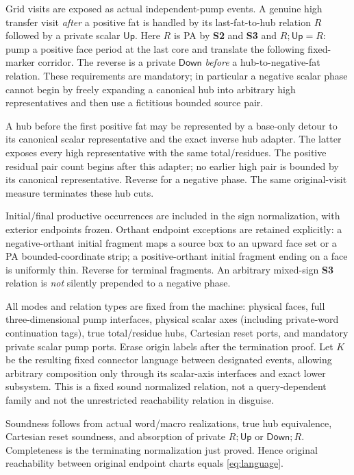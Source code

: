 \documentclass[11pt,a4paper]{article}
\theoremstyle{remark}
\newcommand{\Up}{\mathsf{Up}}
\newcommand{\Down}{\mathsf{Down}}
\begin{document}
Grid visits are exposed as actual independent-pump events. A genuine high transfer visit \emph{after} a positive fat is handled by its last-fat-to-hub relation \(R\) followed by a private scalar \(\Up\). Here \(R\) is PA by \textbf{S2} and \textbf{S3} and \(R;\Up=R\): pump a positive face period at the last core and translate the following fixed-marker corridor. The reverse is a private \(\Down\) \emph{before} a hub-to-negative-fat relation. These requirements are mandatory; in particular a negative scalar phase cannot begin by freely expanding a canonical hub into arbitrary high representatives and then use a fictitious bounded source pair.

A hub before the first positive fat may be represented by a base-only detour to its canonical scalar representative and the exact inverse hub adapter. The latter exposes every high representative with the same total/residues. The positive residual pair count begins after this adapter; no earlier high pair is bounded by its canonical representative. Reverse for a negative phase. The same original-visit measure terminates these hub cuts.

Initial/final productive occurrences are included in the sign normalization, with exterior endpoints frozen. Orthant endpoint exceptions are retained explicitly: a negative-orthant initial fragment maps a source box to an upward face set or a PA bounded-coordinate strip; a positive-orthant initial fragment ending on a face is uniformly thin. Reverse for terminal fragments. An arbitrary mixed-sign \textbf{S3} relation is \emph{not} silently prepended to a negative phase.

All modes and relation types are fixed from the machine: physical faces, full three-dimensional pump interfaces, physical scalar axes (including private-word continuation tags), true total/residue hubs, Cartesian reset ports, and mandatory private scalar pump ports. Erase origin labels after the termination proof. Let \(K\) be the resulting fixed connector language between designated events, allowing arbitrary composition only through its scalar-axis interfaces and exact lower subsystem. This is a fixed sound normalized relation, not a query-dependent family and not the unrestricted reachability relation in disguise.

Soundness follows from actual word/macro realizations, true hub equivalence, Cartesian reset soundness, and absorption of private \(R;\Up\) or \(\Down;R\). Completeness is the terminating normalization just proved. Hence original reachability between original endpoint charts equals \eqref{eq:language}.
\end{document}
